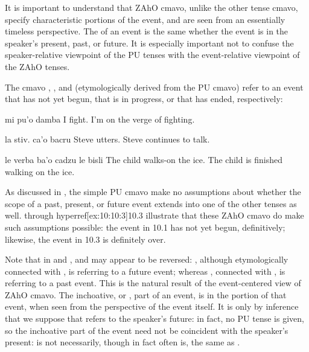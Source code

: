 It is important to understand that ZAhO cmavo, unlike the
    other tense cmavo, specify characteristic portions of the
    event, and are seen from an essentially timeless perspective.
    The  of an event is the same whether the event is
    in the speaker's present, past, or future. It is especially
    important not to confuse the speaker-relative viewpoint of the
    PU tenses with the event-relative viewpoint of the ZAhO
    tenses.

The cmavo , , and  (etymologically
    derived from the PU cmavo) refer to an event that has not yet
    begun, that is in progress, or that has ended,
    respectively:
\begin{example}
mi pu'o damba\n
I  fight.\n
I'm on the verge of fighting.
\end{example}

\begin{example}
la stiv. ca'o bacru\n
Steve  utters.\n
Steve continues to talk.
\end{example}

\begin{example}
le verba ba'o cadzu le bisli\n
The child  walks-on the ice.\n
The child is finished walking on the ice.
\end{example}

As discussed in , the simple PU
    cmavo make no assumptions about whether the scope of a past,
    present, or future event extends into one of the other tenses
    as well.  through hyperref[ex:10:10:3]{10.3} illustrate that these ZAhO cmavo do make
    such assumptions possible: the event in 10.1 has not yet begun,
    definitively; likewise, the event in 10.3 is definitely over. 

Note that in  and ,  and  may
    appear to be reversed: , although etymologically
    connected with , is referring to a future event; whereas
    , connected with , is referring to a past event.
    This is the natural result of the event-centered view of ZAhO
    cmavo. The inchoative, or , part of an event, is in the
     portion of that event, when seen from the
    perspective of the event itself. It is only by inference that
    we suppose that  refers to the
    speaker's future: in fact, no PU tense is given, so the
    inchoative part of the event need not be coincident with the
    speaker's present:  is not necessarily, though in fact
    often is, the same as .


